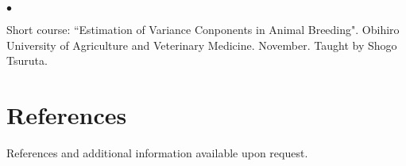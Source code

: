 \documentclass[margin,line,10pt]{res}
\newenvironment{list2}{
  \begin{list}{$\bullet$}{%
      \setlength{\itemsep}{0in}
      \setlength{\parsep}{0in} \setlength{\parskip}{0in}
      \setlength{\topsep}{0in} \setlength{\partopsep}{0in} 
      \setlength{\leftmargin}{0.2in}}}{\end{list}}
\begin{document}
\begin{resume}
\section{}
\begin{list2}
\item Short course: ``Estimation of Variance Conponents in Animal Breeding". Obihiro University of Agriculture and Veterinary Medicine. November. 
Taught by Shogo Tsuruta.  
\end{list2}  




\vspace{0.5cm}
\section{\sc References}
References and additional information available upon request. 

\begin{comment}
\begin{tabular}{ll}
[1] & {\bf \underline{Daniel Gianola}}, Ph.D. Sewall Wright Professor of Animal Breeding and Genetics. \\
    & Department of Animal Sciences, University of Wisconsin-Madison. \\ 
    & Address: 1675 Observatory Dr. Madison, WI 53706-1284.  \\
    & E-mail: gianola -at- ansci.wisc.edu, Phone: 608-265-2054
\end{tabular}
\end{comment}



\end{resume}
\end{document}
